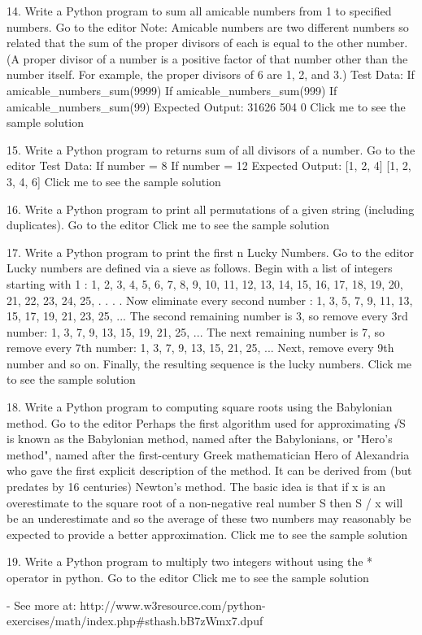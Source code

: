 14. Write a Python program to sum all amicable numbers from 1 to specified numbers. Go to the editor
Note: Amicable numbers are two different numbers so related that the sum of the proper divisors of each is equal to the other number. (A proper divisor of a number is a positive factor of that number other than the number itself. For example, the proper divisors of 6 are 1, 2, and 3.)
Test Data:
If amicable_numbers_sum(9999)
If amicable_numbers_sum(999)
If amicable_numbers_sum(99)
Expected Output:
31626
504
0 
Click me to see the sample solution

15. Write a Python program to returns sum of all divisors of a number. Go to the editor
Test Data:
If number = 8
If number = 12
Expected Output:
[1, 2, 4]
[1, 2, 3, 4, 6] 
Click me to see the sample solution

16. Write a Python program to print all permutations of a given string (including duplicates). Go to the editor
Click me to see the sample solution

17. Write a Python program to print the first n Lucky Numbers. Go to the editor
Lucky numbers are defined via a sieve as follows.
Begin with a list of integers starting with 1 :
1, 2, 3,	4, 5, 6,	7, 8, 9, 10, 11, 12, 13, 14, 15, 16, 17, 18, 19, 20, 21, 22, 23, 24, 25, . . . .
Now eliminate every second number :
1, 3, 5, 7, 9, 11, 13, 15, 17, 19, 21, 23, 25, ...
The second remaining number is 3, so remove every 3rd number:
1, 3, 7, 9, 13, 15, 19, 21, 25, ...
The next remaining number is 7, so remove every 7th number:
1, 3, 7, 9, 13, 15, 21, 25, ...
Next, remove every 9th number and so on. 
Finally, the resulting sequence is the lucky numbers.
Click me to see the sample solution

18. Write a Python program to computing square roots using the Babylonian method. Go to the editor
Perhaps the first algorithm used for approximating √S is known as the Babylonian method, named after the Babylonians, or "Hero's method", named after the first-century Greek mathematician Hero of Alexandria who gave the first explicit description of the method. It can be derived from (but predates by 16 centuries) Newton's method. The basic idea is that if x is an overestimate to the square root of a non-negative real number S then S / x will be an underestimate and so the average of these two numbers may reasonably be expected to provide a better approximation.
Click me to see the sample solution

19. Write a Python program to multiply two integers without using the * operator in python. Go to the editor
Click me to see the sample solution

- See more at: http://www.w3resource.com/python-exercises/math/index.php#sthash.bB7zWmx7.dpuf

